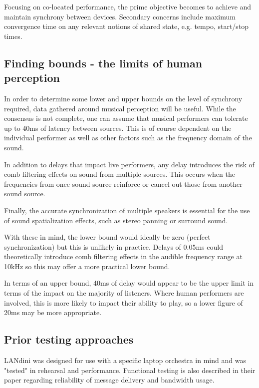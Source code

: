 \documentclass[11pt]{article} %
\theoremstyle{plain}
\theoremstyle{definition}
\begin{document}
Focusing on co-located performance, the prime objective becomes to achieve and
maintain synchrony between devices. Secondary concerns include maximum
convergence time on any relevant notions of shared state, e.g. tempo,
start/stop times.

\subsection{Finding bounds - the limits of human perception}

In order to determine some lower and upper bounds on the level of synchrony
required, data gathered around musical perception will be useful. While the
consensus is not complete\cite{greeff2016influence}, one can assume that
musical performers can tolerate up to 40ms of latency between sources. This is
of course dependent on the individual performer as well as other factors such
as the frequency domain of the sound.

In addition to delays that impact live performers, any delay introduces the
risk of comb filtering effects on sound from multiple sources. This occurs when
the frequencies from once sound source reinforce or cancel out those from
another sound source.

Finally, the accurate synchronization of multiple speakers is essential for the
use of sound spatialization effects, such as stereo panning or surround sound.

With these in mind, the lower bound would ideally be zero (perfect
synchronization) but this is unlikely in practice. Delays of 0.05ms could
theoretically introduce comb filtering effects in the audible frequency range
at 10kHz\cite{lester2007effects} so this may offer a more practical lower bound.

In terms of an upper bound, 40ms of delay would appear to be the upper limit in
terms of the impact on the majority of listeners. Where human performers are
involved, this is more likely to impact their ability to play, so a lower
figure of 20ms may be more appropriate\cite{chafe2004network}.

\subsection{Prior testing approaches}

LANdini\cite{narveson2013landini} was designed for use with a specific laptop
orchestra in mind and was "tested" in rehearsal and performance. Functional
testing is also described in their paper regarding reliability of message
delivery and bandwidth usage.
\end{document}

